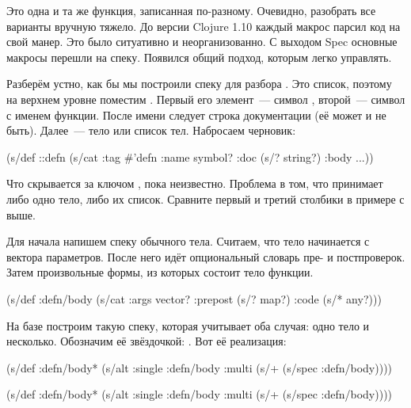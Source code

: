 \fi

Это одна и та же функция, записанная по-разному. Очевидно, разобрать все
варианты вручную тяжело. До версии Clojure 1.10 каждый макрос парсил код на свой
манер. Это было ситуативно и неорганизованно. С выходом Spec основные макросы
перешли на спеку. Появился общий подход, которым легко управлять.


Разберём устно, как бы мы построили спеку для разбора . Это список,
поэтому на верхнем уровне поместим . Первый его элемент~--- символ
, второй~--- символ с именем функции. После имени следует строка
документации (её может и не быть). Далее~--- тело или список тел. Набросаем
черновик:


\begin{clojure}
(s/def ::defn
  (s/cat :tag #{'defn}
         :name symbol?
         :doc (s/? string?)
         :body ...))
\end{clojure}


Что скрывается за ключом , пока неизвестно. Проблема в том, что
 принимает либо одно тело, либо их список. Сравните первый и третий
столбики в примере с  выше.

Для начала напишем спеку обычного тела. Считаем, что тело начинается с вектора
параметров. После него идёт опциональный словарь пре- и постпроверок. Затем
произвольные формы, из которых состоит тело функции.


\begin{clojure}
(s/def :defn/body
  (s/cat :args vector?
         :prepost (s/? map?)
         :code (s/* any?)))
\end{clojure}


На базе  построим такую спеку, которая учитывает оба случая:
одно тело и несколько. Обозначим её звёздочкой: . Вот её
реализация:

\ifnarrow


\begin{clojure}
(s/def :defn/body*
  (s/alt :single :defn/body
         :multi (s/+
                  (s/spec :defn/body))))
\end{clojure}


\else


\begin{clojure}
(s/def :defn/body*
  (s/alt :single :defn/body
         :multi (s/+ (s/spec :defn/body))))
\end{clojure}


